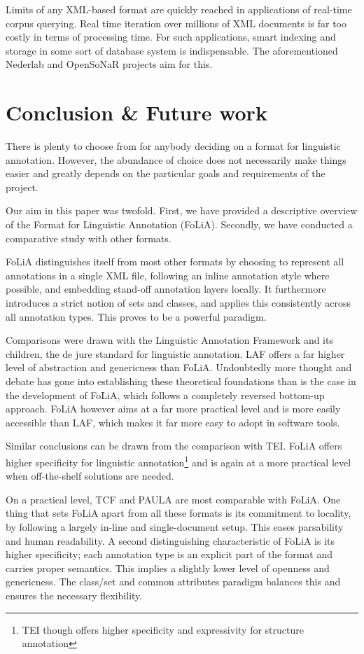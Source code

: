 \documentclass[a4paper,10pt,twoside]{article}
\begin{document}
Limits of any XML-based format are quickly reached in applications of real-time corpus
querying. Real time iteration over millions of XML documents is far too costly in terms
of processing time. For such applications, smart indexing and storage in some sort of
database system is indispensable. The aforementioned Nederlab and OpenSoNaR
projects aim for this. 

\section{Conclusion \& Future work}

There is plenty to choose from for anybody deciding on a format for
linguistic annotation. However, the abundance of choice does not necessarily make
things easier and greatly depends on the particular goals and requirements of the
project.  

Our aim in this paper was twofold. First, we have provided a descriptive
overview of the Format for Linguistic Annotation (FoLiA). Secondly, we have
conducted a comparative study with other formats.

FoLiA distinguishes itself from most other formats by choosing to represent
all annotations in a single XML file, following an inline annotation style where
possible, and embedding stand-off annotation layers locally. It furthermore
introduces a strict notion of sets and classes, and applies this consistently
across all annotation types. This proves to be a powerful paradigm.

Comparisons were drawn with the Linguistic Annotation Framework and its
children, the de jure standard for linguistic annotation. LAF offers a far
higher level of abstraction and genericness than FoLiA. Undoubtedly more
thought and debate has gone into establishing these theoretical foundations
than is the case in the development of FoLiA, which follows a completely
reversed bottom-up approach. FoLiA however aims at a far more practical level and is
more easily accessible than LAF, which makes it far more easy to adopt in
software tools. 

Similar conclusions can be drawn from the comparison with TEI. FoLiA offers
higher specificity for linguistic annotation\footnote{TEI though offers higher
specificity and expressivity for structure annotation} and is again at a more
practical level when off-the-shelf solutions are needed.

On a practical level, TCF and PAULA are most comparable with FoLiA. One thing
that sets FoLiA apart from all these formats is its commitment to locality, by
following a largely in-line and single-document setup. This eases
parsability and human readability. A second distinguishing characteristic of
FoLiA is its higher specificity; each annotation type is an explicit part of
the format and carries proper semantics. This implies a slightly lower level of
openness and genericness. The class/set and common attributes paradigm balances
this and ensures the necessary flexibility.
\end{document}
